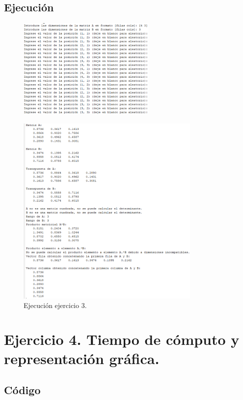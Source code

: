 \documentclass[a4paper, 12pt]{article}
\begin{document}
	\subsection{Ejecución}
	\begin{figure}[htp!]
		\includegraphics[width=0.6\textwidth]{figures/ejc3.1.png}
	\end{figure}
	\begin{figure}[htp!]
		\includegraphics[width=0.8\textwidth]{figures/ejc3.2.png}
		\caption{Ejecución ejercicio 3.}
	\end{figure}
	\newpage
	
	\section{Ejercicio 4. Tiempo de cómputo y representación gráfica.}
	
	\subsection{Código}
	\inputminted[fontsize=\scriptsize, linenos, breaklines=true, xleftmargin=0.75cm, frame=lines]{matlab}{code/Ejercicio4.m}
	\newpage
\end{document}
